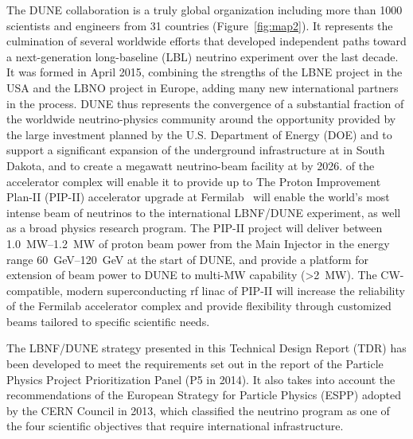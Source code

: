 The DUNE collaboration is a truly global organization including more than \num{1000} scientists and engineers from \num{31} countries (Figure~\ref{fig:map2}). It represents the culmination of several worldwide efforts that developed independent paths toward a next-generation long-baseline (LBL) neutrino experiment over the last decade. It was formed in April 2015, combining the strengths of the LBNE project in the USA and the LBNO project in Europe, adding many new international partners in the process. DUNE thus represents the convergence of a substantial fraction of the worldwide neutrino-physics community around the opportunity provided by the large investment planned by the U.S. Department of Energy (DOE) and \fnal to support a significant expansion of the underground infrastructure at \surf in South Dakota, and to create a megawatt neutrino-beam facility at \fnal by 2026. 
of the accelerator complex will enable it to provide up to %
The Proton Improvement Plan-II (PIP-II) accelerator upgrade at Fermilab~\cite{pip2-2013} will enable the world’s most intense beam of neutrinos to the international LBNF/DUNE experiment, as well as a broad physics research program. 
The PIP-II project will deliver between \SIrange{1.0}{1.2}{\MW} of proton beam power from the Main Injector in the energy range \SIrange{60}{120}{\GeV} at the start of DUNE, and provide a platform for extension of beam power to DUNE to multi-MW capability (>\SI{2}{\MW}). 
The CW-compatible, modern superconducting rf linac of PIP-II will increase the reliability of the Fermilab accelerator complex and provide flexibility through customized  beams tailored to specific scientific needs.  


The LBNF/DUNE strategy presented in this Technical Design Report (TDR) has been developed to meet the requirements set out in the report of the Particle Physics Project Prioritization Panel (P5 in 2014). It also takes into account the recommendations of the European Strategy for Particle  Physics (ESPP) adopted by the CERN Council in 2013, which classified the  neutrino program as one of the four scientific objectives that require international infrastructure.

